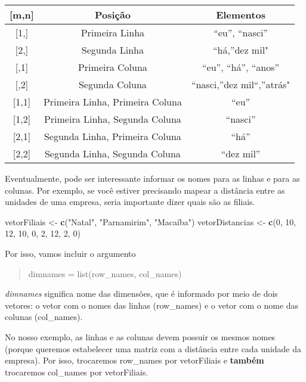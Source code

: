 \documentclass[
]{book}
\newenvironment{Shaded}{\begin{snugshade}}{\end{snugshade}}
\newcommand{\DecValTok}[1]{\textcolor[rgb]{0.00,0.00,0.81}{#1}}
\newcommand{\KeywordTok}[1]{\textcolor[rgb]{0.13,0.29,0.53}{\textbf{#1}}}
\newcommand{\NormalTok}[1]{#1}
\newcommand{\StringTok}[1]{\textcolor[rgb]{0.31,0.60,0.02}{#1}}
\begin{document}
\begin{longtable}[]{@{}ccc@{}}
\toprule
{[}m,n{]} & Posição & Elementos\tabularnewline
\midrule
\endhead
{[}1,{]} & Primeira Linha & ``eu'', ``nasci''\tabularnewline
{[}2,{]} & Segunda Linha & ``há,''dez mil"\tabularnewline
{[},1{]} & Primeira Coluna & ``eu'', ``há'', ``anos''\tabularnewline
{[},2{]} & Segunda Coluna & ``nasci,''dez mil``,''atrás"\tabularnewline
{[}1,1{]} & Primeira Linha, Primeira Coluna & ``eu''\tabularnewline
{[}1,2{]} & Primeira Linha, Segunda Coluna & ``nasci''\tabularnewline
{[}2,1{]} & Segunda Linha, Primeira Coluna & ``há''\tabularnewline
{[}2,2{]} & Segunda Linha, Segunda Coluna & ``dez mil''\tabularnewline
\bottomrule
\end{longtable}

Eventualmente, pode ser interessante informar os nomes para as linhas e para as colunas. Por exemplo, se você estiver precisando mapear a distância entre as unidades de uma empresa, seria importante dizer quais são as filiais.

\begin{Shaded}
\begin{Highlighting}[]
\NormalTok{vetorFiliais <-}\StringTok{ }\KeywordTok{c}\NormalTok{(}\StringTok{"Natal"}\NormalTok{, }\StringTok{"Parnamirim"}\NormalTok{, }\StringTok{"Macaíba"}\NormalTok{)}
\NormalTok{vetorDistancias <-}\StringTok{ }\KeywordTok{c}\NormalTok{(}\DecValTok{0}\NormalTok{, }\DecValTok{10}\NormalTok{, }\DecValTok{12}\NormalTok{, }\DecValTok{10}\NormalTok{, }\DecValTok{0}\NormalTok{, }\DecValTok{2}\NormalTok{, }\DecValTok{12}\NormalTok{, }\DecValTok{2}\NormalTok{, }\DecValTok{0}\NormalTok{)}
\end{Highlighting}
\end{Shaded}

Por isso, vamos incluir o argumento

\begin{quote}
dimnames = list(row\_names, col\_names)
\end{quote}

\emph{dimnames} significa nome das dimensões, que é informado por meio de dois vetores: o vetor com o nomes das linhas (row\_names) e o vetor com o nome das colunas (col\_names).

No nosso exemplo, as linhas e as colunas devem possuir os mesmos nomes (porque queremos estabelecer uma matriz com a distância entre cada unidade da empresa). Por isso, trocaremos row\_names por vetorFiliais e \textbf{também} trocaremos col\_names por vetorFiliais.
\end{document}
